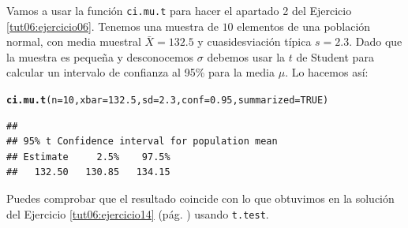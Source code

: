 \documentclass[10pt,a4paper]{article}\usepackage[]{graphicx}\usepackage[]{color}
\makeatletter
\newcommand{\hlnum}[1]{\textcolor[rgb]{0.686,0.059,0.569}{#1}}%
\newcommand{\hlstd}[1]{\textcolor[rgb]{0.345,0.345,0.345}{#1}}%
\newcommand{\hlkwc}[1]{\textcolor[rgb]{0.333,0.667,0.333}{#1}}%
\newcommand{\hlkwd}[1]{\textcolor[rgb]{0.737,0.353,0.396}{\textbf{#1}}}%
\newenvironment{kframe}{%
 \def\at@end@of@kframe{}%
 \ifinner\ifhmode%
  \def\at@end@of@kframe{\end{minipage}}%
  \begin{minipage}{\columnwidth}%
 \fi\fi%
 \def\FrameCommand##1{\hskip\@totalleftmargin \hskip-\fboxsep
 \colorbox{shadecolor}{##1}\hskip-\fboxsep
     \hskip-\linewidth \hskip-\@totalleftmargin \hskip\columnwidth}%
 \MakeFramed {\advance\hsize-\width
   \@totalleftmargin\z@ \linewidth\hsize
   \@setminipage}}%
 {\par\unskip\endMakeFramed%
 \at@end@of@kframe}
\newenvironment{knitrout}{}{} %
\makeatother
\begin{document}
Vamos a usar la función {\tt ci.mu.t} para hacer el apartado 2 del Ejercicio \ref{tut06:ejercicio06}. Tenemos una muestra de $10$ elementos de una población normal, con media muestral $\bar X=132.5$ y cuasidesviación típica $s=2.3$. Dado que la muestra es pequeña y desconocemos $\sigma$ debemos usar la $t$ de Student para calcular un intervalo  de confianza al 95\% para la media $\mu$. Lo hacemos así:
\begin{knitrout}
\color{fgcolor}\begin{kframe}
\begin{alltt}
\hlkwd{ci.mu.t}\hlstd{(}\hlkwc{n}\hlstd{=}\hlnum{10}\hlstd{,} \hlkwc{xbar}\hlstd{=}\hlnum{132.5}\hlstd{,} \hlkwc{sd}\hlstd{=}\hlnum{2.3}\hlstd{,} \hlkwc{conf}\hlstd{=}\hlnum{0.95}\hlstd{,} \hlkwc{summarized}\hlstd{=}\hlnum{TRUE}\hlstd{)}
\end{alltt}
\begin{verbatim}
## 
## 95% t Confidence interval for population mean 
## Estimate     2.5%    97.5% 
##   132.50   130.85   134.15
\end{verbatim}
\end{kframe}
\end{knitrout}
Puedes comprobar que el resultado coincide con lo que obtuvimos en la solución del Ejercicio \ref{tut06:ejercicio14} (pág. \pageref{tut06:ejercicio14:sol}) usando {\tt t.test}.\\
\end{document}
